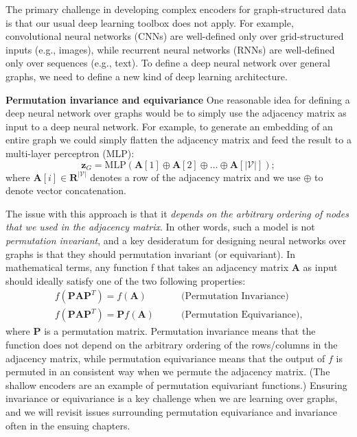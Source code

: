 \documentclass[10pt]{book}
\begin{document}
The primary challenge in developing complex encoders for graph-structured data is that our usual deep learning toolbox does not apply. For example, convolutional neural networks (CNNs) are well-defined only over grid-structured inputs (e.g., images), while recurrent neural networks (RNNs) are well-defined only over sequences (e.g., text). To define a deep neural network over general graphs, we need to define a new kind of deep learning architecture.

\textbf{Permutation invariance and equivariance} One reasonable idea for
defining a deep neural network over graphs would be to simply use the
adjacency matrix as input to a deep neural network. For example, to generate an embedding of an entire graph we could simply flatten the adjacency
matrix and feed the result to a multi-layer perceptron (MLP):
\begin{equation}
    \mathbf z_G = \text{MLP}(\mathbf A[1] \oplus \mathbf A[2] \oplus \ldots \oplus \mathbf A[|\mathcal V|]);
\end{equation}
where $\mathbf A[i] \in \mathbf R^{|\mathcal V|}$ denotes a row of the adjacency matrix and we use $\oplus$ to denote vector concatenation.

The issue with this approach is that it \textit{depends on the arbitrary ordering of nodes that we used in the adjacency matrix}. In other words, such a model is not \textit{permutation invariant}, and a key desideratum for designing neural networks over graphs is that they should permutation invariant (or equivariant). In mathematical terms, any function f that takes an adjacency matrix $\mathbf A$ as input should ideally satisfy one of the two following properties:
\begin{align}
    f(\mathbf{PAP}^T) = f(\mathbf A) \qquad &\text{(Permutation Invariance)} \\
    f(\mathbf{PAP}^T) = \mathbf P f(\mathbf A) \qquad &\text{(Permutation Equivariance)},
\end{align}
where $\mathbf P$ is a permutation matrix. Permutation invariance means that the function does not depend on the arbitrary ordering of the rows/columns in the adjacency matrix, while permutation equivariance means that the output of $f$ is permuted in an consistent way when we permute the adjacency matrix. (The shallow encoders are an example of permutation equivariant functions.) Ensuring invariance or equivariance is a key challenge when we are learning over graphs, and we will revisit issues surrounding permutation equivariance and invariance often in the ensuing chapters.
\end{document}
